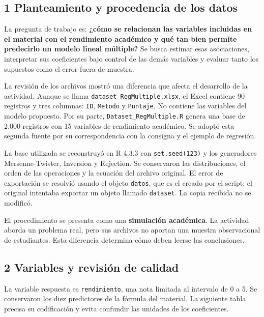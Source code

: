 \documentclass[
  11pt,
  letterpaper,
]{article}
\begin{document}
\hypertarget{planteamiento-y-procedencia-de-los-datos}{%
\subsection{1 Planteamiento y procedencia de los
datos}\label{planteamiento-y-procedencia-de-los-datos}}

La pregunta de trabajo es: \textbf{¿cómo se relacionan las variables
incluidas en el material con el rendimiento académico y qué tan bien
permite predecirlo un modelo lineal múltiple?} Se busca estimar esas
asociaciones, interpretar sus coeficientes bajo control de las demás
variables y evaluar tanto los supuestos como el error fuera de muestra.

La revisión de los archivos mostró una diferencia que afecta el
desarrollo de la actividad. Aunque se llama
\texttt{dataset\_RegMultiple.xlsx}, el Excel contiene 90 registros y
tres columnas: \texttt{ID}, \texttt{Metodo} y \texttt{Puntaje}. No
contiene las variables del modelo propuesto. Por su parte,
\texttt{Dataset\_RegMultiple.R} genera una base de 2.000 registros con
15 variables de rendimiento académico. Se adoptó esta segunda fuente por
su correspondencia con la consigna y el ejemplo de regresión.

La base utilizada se reconstruyó en R 4.3.3 con \texttt{set.seed(123)} y
los generadores Mersenne-Twister, Inversion y Rejection. Se conservaron
las distribuciones, el orden de las operaciones y la ecuación del
archivo original. El error de exportación se resolvió usando el objeto
\texttt{datos}, que es el creado por el script; el original intentaba
exportar un objeto llamado \texttt{dataset}. La copia recibida no se
modificó.

El procedimiento se presenta como una \textbf{simulación académica}. La
actividad aborda un problema real, pero sus archivos no aportan una
muestra observacional de estudiantes. Esta diferencia determina cómo
deben leerse las conclusiones.

\newpage

\hypertarget{variables-y-revisiuxf3n-de-calidad}{%
\subsection{2 Variables y revisión de
calidad}\label{variables-y-revisiuxf3n-de-calidad}}

La variable respuesta es \texttt{rendimiento}, una nota limitada al
intervalo de 0 a 5. Se conservaron los diez predictores de la fórmula
del material. La siguiente tabla precisa su codificación y evita
confundir las unidades de los coeficientes.
\end{document}

